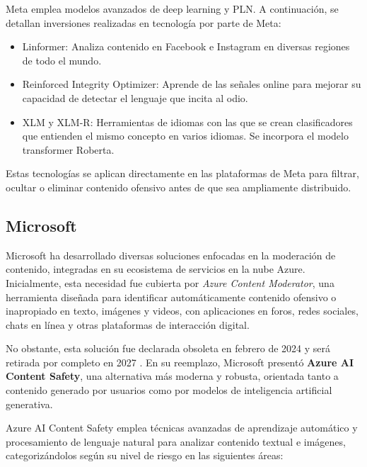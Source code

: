 Meta emplea modelos avanzados de deep learning y PLN. A continuación, se detallan inversiones realizadas en tecnología por parte de Meta:

\begin{itemize}
    \item Linformer: Analiza contenido en Facebook e Instagram en diversas regiones de todo el mundo.
    \item Reinforced Integrity Optimizer: Aprende de las señales online para mejorar su capacidad de detectar el lenguaje que incita al odio.
\end{itemize}








\vspace{0.5cm}

\begin{itemize}
    \item XLM y XLM-R: Herramientas de idiomas con las que se crean clasificadores que entienden el mismo concepto en varios idiomas. Se incorpora el modelo transformer Roberta.
\end{itemize}

Estas tecnologías se aplican directamente en las plataformas de Meta para filtrar, ocultar o eliminar contenido ofensivo antes de que sea ampliamente distribuido.

\subsection{Microsoft}

Microsoft ha desarrollado diversas soluciones enfocadas en la moderación de contenido, integradas en su ecosistema de servicios en la nube Azure. Inicialmente, esta necesidad fue cubierta por \textit{Azure Content Moderator}, una herramienta diseñada para identificar automáticamente contenido ofensivo o inapropiado en texto, imágenes y videos, con aplicaciones en foros, redes sociales, chats en línea y otras plataformas de interacción digital.

No obstante, esta solución fue declarada obsoleta en febrero de 2024 y será retirada por completo en 2027 \cite{microsoft2025contentmoderator}. En su reemplazo, Microsoft presentó \textbf{Azure AI Content Safety}, una alternativa más moderna y robusta, orientada tanto a contenido generado por usuarios como por modelos de inteligencia artificial generativa.

Azure AI Content Safety emplea técnicas avanzadas de aprendizaje automático y procesamiento de lenguaje natural para analizar contenido textual e imágenes, categorizándolos según su nivel de riesgo en las siguientes áreas:

